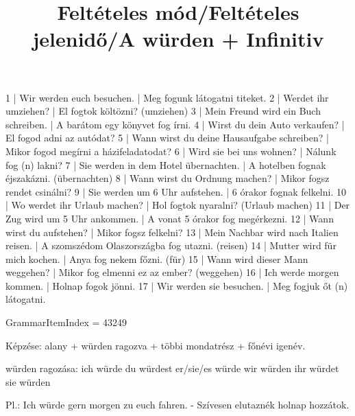 \begin{exmp}
1 | Wir werden euch besuchen. | Meg fogunk látogatni titeket.
2 | Werdet ihr umziehen? | El fogtok költözni? (umziehen)
3 | Mein Freund wird ein Buch schreiben. | A barátom egy könyvet fog írni.
4 | Wirst du dein Auto verkaufen? | El fogod adni az autódat?
5 | Wann wirst du deine Hausaufgabe schreiben? | Mikor fogod megírni a házifeladatodat?
6 | Wird sie bei uns wohnen? | Nálunk fog (n) lakni?
7 | Sie werden in dem Hotel übernachten. | A hotelben fognak éjszakázni. (übernachten)
8 | Wann wirst du Ordnung machen? | Mikor fogsz rendet csinálni?
9 | Sie werden um 6 Uhr aufstehen. | 6 órakor fognak felkelni.
10 | Wo werdet ihr Urlaub machen? | Hol fogtok nyaralni? (Urlaub machen)
11 | Der Zug wird um 5 Uhr ankommen. | A vonat 5 órakor fog megérkezni.
12 | Wann wirst du aufstehen? | Mikor fogsz felkelni?
13 | Mein Nachbar wird nach Italien reisen. | A szomszédom Olaszországba fog utazni. (reisen)
14 | Mutter wird für mich kochen. | Anya fog nekem főzni. (für)
15 | Wann wird dieser Mann weggehen? | Mikor fog elmenni ez az ember? (weggehen)
16 | Ich werde morgen kommen. | Holnap fogok jönni.
17 | Wir werden sie besuchen. | Meg fogjuk őt (n) látogatni.
\end{exmp}

\title{Feltételes mód/Feltételes jelenidő/A würden + Infinitiv}

GrammarItemIndex = 43249

\begin{desc}
Képzése: alany + würden ragozva + többi mondatrész + főnévi igenév.

würden ragozása:
ich würde
du würdest
er/sie/es würde
wir würden
ihr würdet
sie würden

Pl.: Ich würde gern morgen zu euch fahren. - Szívesen elutaznék holnap hozzátok.
\end{desc}

